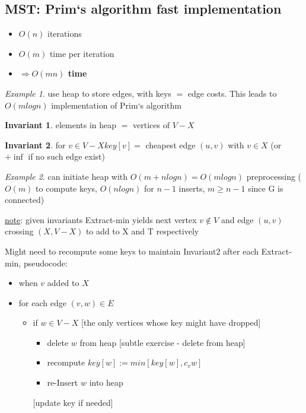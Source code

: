 \documentclass[a4paper,12pt]{article}
\theoremstyle{plain}
\theoremstyle{definition}
\newtheorem{invariant}{Invariant}[subsection]
\theoremstyle{remark}
\newtheorem*{example}{Example}
\begin{document}
\subsection{MST: Prim`s algorithm fast implementation}
\begin{itemize}
	\item $O(n)$ iterations
	\item $O(m)$ time per iteration
	\item \textbf{$\Rightarrow O(mn)$ time}
\end{itemize}

\begin{example}use heap to store edges, with keys $=$ edge costs. This leads to $O(m log n)$ implementation of Prim`s algorithm\end{example}

\begin{invariant}elements in heap $=$ vertices of $V-X$\end{invariant}
\begin{invariant}for $v \in V-X key[v] =$ cheapest edge $(u,v)$ with $v \in X$ (or $+\inf$ if no such edge exist)\end{invariant}

\begin{example}can initiate heap with $O(m+n log n) = O(m log n)$ preprocessing ($O(m)$ to compute keys, $O(n log n)$ for $n-1$ inserts, $m \geq n-1$ since G is connected)\end{example}

\underline{note}: given invariants Extract-min yields next vertex $v \notin V$ and edge $(u,v)$ crossing $(X,V-X)$ to add to X and T respectively

Might need to recompute some keys to maintain Invariant2 after each Extract-min, pseudocode:
\begin{itemize}
\item when $v$ added to $X$
\item for each edge $(v,w) \in E$
	\begin{itemize}
		\item if $w \in V-X$
		[the only vertices whose key might have dropped]
		\begin{itemize}
			\item delete $w$ from heap
			[subtle exercise - delete from heap]
			\item recompute $key[w]:= min[key[w],c_vw]$
			\item re-Insert $w$ into heap
		\end{itemize}
		[update key if needed]
	\end{itemize}
\end{itemize}
\end{document}
